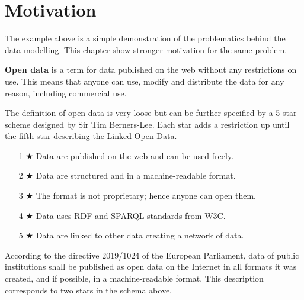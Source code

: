 \section*{Motivation}


The example above is a simple demonstration of the problematics behind the data modelling. This chapter show stronger motivation for the same problem.

\smallskip

\textbf{Open data} is a term for data published on the web without any restrictions on use. This means that anyone can use, modify and distribute the data for any reason, including commercial use.

The definition of open data is very loose but can be further specified by a 5-star scheme designed by Sir Tim Berners-Lee. Each star adds a restriction up until the fifth star describing the Linked Open Data.
\begin{itemize}[noitemsep,leftmargin=2cm]
    \item [1 $\bigstar$] Data are published on the web and can be used freely.
    \item [2 $\bigstar$] Data are structured and in a machine-readable format.
    \item [3 $\bigstar$] The format is not proprietary; hence anyone can open them.
    \item [4 $\bigstar$] Data uses RDF and SPARQL standards from W3C.
    \item [5 $\bigstar$] Data are linked to other data creating a network of data.
\end{itemize}

\smallskip

According to the directive 2019/1024 of the European Parliament, data of public institutions shall be published as open data on the Internet in all formats it was created, and if possible, in a machine-readable format. This description corresponds to two stars in the schema above.


